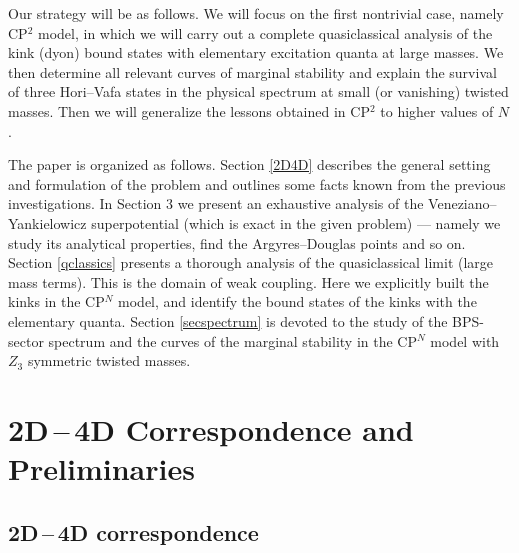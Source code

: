 \documentclass[epsfig,12pt]{article}
\begin{document}
	Our strategy will be as follows. 
	We will focus on the first nontrivial case, namely CP$^2$ model,
	in which we will carry out a complete quasiclassical analysis of the kink (dyon) bound states   with elementary
	excitation quanta at large masses. 
	We then determine all relevant curves of marginal stability and 
	explain the survival of three Hori--Vafa \cite{MR1} states in the physical spectrum at small (or vanishing) twisted masses.
	Then we will generalize the lessons obtained in CP$^2$ to higher values of $N$.
	
	The paper is organized as follows.  
	Section  \ref{2D4D} describes the general setting and formulation of the problem and 
	outlines some facts known from the previous investigations. 
	In Section 3 we present an exhaustive analysis of the 
	Veneziano--Yankielowicz superpotential (which is exact in the given problem) --- 
	namely we study its analytical properties, find the Argyres--Douglas points and so on.	
	Section \ref{qclassics} presents a thorough analysis of the quasiclassical limit (large mass terms).
	This is the domain of weak coupling. 
	Here we explicitly built the kinks in the CP$^N$ model, and 
	identify the bound states of the kinks with the elementary quanta. 
	Section \ref{secspectrum} is devoted to the study of the BPS-sector spectrum and 
	the curves of the marginal stability in the CP$^N$ model with $Z_3$ symmetric twisted masses.






\section{2D\,--\,4D Correspondence and Preliminaries}
\setcounter{equation}{0}
\label{2D4D}




\subsection{2D\,--\,4D correspondence }
\end{document}

